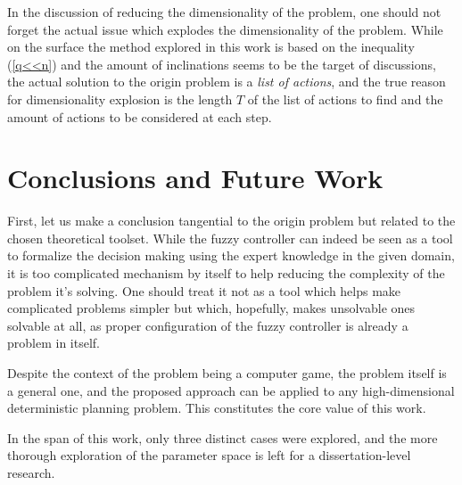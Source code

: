 \documentclass[11pt, a4paper]{article}
\begin{document}
	In the discussion of reducing the dimensionality of the problem, one should not forget the actual issue which explodes the dimensionality of the problem.
	While on the surface the method explored in this work is based on the inequality (\ref{q<<n}) and the amount of inclinations seems to be the target of discussions, the actual solution to the origin problem is a \textit{list of actions}, and the true reason for dimensionality explosion is the length $T$ of the list of actions to find and the amount of actions to be considered at each step.
	
	\section{Conclusions and Future Work}

	First, let us make a conclusion tangential to the origin problem but related to the chosen theoretical toolset.
	While the fuzzy controller can indeed be seen as a tool to formalize the decision making using the expert knowledge in the given domain, it is too complicated mechanism by itself to help reducing the complexity of the problem it's solving.
	One should treat it not as a tool which helps make complicated problems simpler but which, hopefully, makes unsolvable ones solvable at all, as proper configuration of the fuzzy controller is already a problem in itself.

	Despite the context of the problem being a computer game, the problem itself is a general one, and the proposed approach can be applied to any high-dimensional deterministic planning problem.
	This constitutes the core value of this work.

	In the span of this work, only three distinct cases were explored, and the more thorough exploration of the parameter space is left for a dissertation-level research.

	\printbibliography
\end{document}
